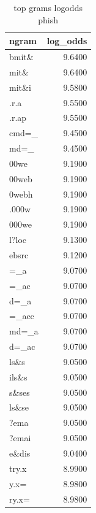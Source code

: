 \begin{table}[htbp]
\caption{top grams logodds phish}
\label{tab:top_grams_logodds_phish}
\begin{tabular}{lr}
\toprule
ngram & log_odds \\
\midrule
bmit\& & 9.6400 \\
mit\& & 9.6400 \\
mit\&i & 9.5800 \\
.r.a & 9.5500 \\
.r.ap & 9.5500 \\
cmd=\_ & 9.4500 \\
md=\_ & 9.4500 \\
00we & 9.1900 \\
00web & 9.1900 \\
0webh & 9.1900 \\
.000w & 9.1900 \\
000we & 9.1900 \\
l?loc & 9.1300 \\
ebsrc & 9.1200 \\
=\_a & 9.0700 \\
=\_ac & 9.0700 \\
d=\_a & 9.0700 \\
=\_acc & 9.0700 \\
md=\_a & 9.0700 \\
d=\_ac & 9.0700 \\
ls\&s & 9.0500 \\
ils\&s & 9.0500 \\
s\&ses & 9.0500 \\
ls\&se & 9.0500 \\
?ema & 9.0500 \\
?emai & 9.0500 \\
e\&dis & 9.0400 \\
try.x & 8.9900 \\
y.x= & 8.9800 \\
ry.x= & 8.9800 \\
\bottomrule
\end{tabular}
\end{table}
